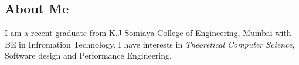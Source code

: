 \documentclass[12pt,a4paper,sans]{moderncv}
\begin{document}
 	\makecvtitle
 	\subsection{\hspace{10em} About Me} %
	I am a recent graduate from K.J Somiaya College of Engineering, Mumbai with BE in Infromation Technology. I have interests in \emph{Theoretical Computer Science}, Software design and Performance Engineering.  
	 
	 
	 
	 \vspace{-20pt} %
	 
	 

 
\end{document}
